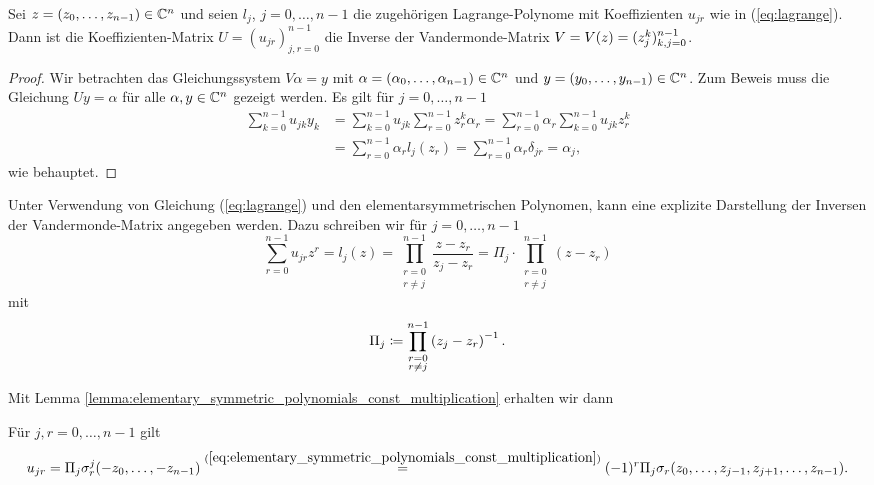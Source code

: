 \begin{lemma}
    \label{lemma:vandermonde-inversion}
    Sei $z = (z_0, \dots, z_{n-1}) \in \mathbb{C}^n$ und seien
    $l_j$, $j = 0, \dots, n-1$ die zugehörigen Lagrange-Polynome
    mit Koeffizienten $u_{jr}$ wie in (\ref{eq:lagrange}).
    Dann ist die Koeffizienten-Matrix $U = (u_{jr})_{j,r = 0}^{n-1}$ die
    Inverse der Vandermonde-Matrix $V = V \! \left( z \right) = (z_{j}^{k})_{k,j = 0}^{n-1}$.
\end{lemma}

\begin{proof}
    Wir betrachten das Gleichungssystem $V \alpha = y$ mit
    $\alpha = (\alpha_0, \dots, \alpha_{n-1}) \in \mathbb{C}^n$
    und $y = (y_0, \dots, y_{n-1}) \in \mathbb{C}^n$.
    Zum Beweis muss die Gleichung $U y = \alpha$ für alle $\alpha,  y \in \mathbb{C}^n$
    gezeigt werden.
    Es gilt für $j = 0, \dots, n-1$
    \[
        \begin{split}
            \sum_{k=0}^{n-1} u_{jk} y_k &= \sum_{k=0}^{n-1} u_{jk} \sum_{r=0}^{n-1} z_r^k \alpha_r = \sum_{r=0}^{n-1} \alpha_r \sum_{k=0}^{n-1} u_{jk} z_r^k\\
                                        &= \sum_{r=0}^{n-1} \alpha_r l_j(z_r) = \sum_{r=0}^{n-1} \alpha_r \delta_{jr} = \alpha_j,
        \end{split}
    \]
    wie behauptet.
\end{proof}

Unter Verwendung von Gleichung (\ref{eq:lagrange}) und den
elementarsymmetrischen Polynomen, kann eine explizite Darstellung der
Inversen der Vandermonde-Matrix angegeben werden.
Dazu schreiben wir für $j = 0, \dots, n-1$
\begin{equation*}
    \sum_{r = 0}^{n-1} u_{jr} z^{r}
    = l_j(z)
    = \prod_{\substack{r=0\\ r \neq j}}^{n-1} \frac{z - z_r}{z_j - z_r}
    = \Pi_j \cdot \prod_{\substack{r=0\\ r \neq j}}^{n-1} \left( z - z_r \right)
\end{equation*}
mit
\begin{equation}
    \label{def:pi_j}
    \Pi_j \coloneqq \prod_{\substack{r=0\\ r \neq j}}^{n-1} \left( z_j - z_r \right)^{-1}.
\end{equation}

\noindent Mit Lemma
\ref{lemma:elementary_symmetric_polynomials_const_multiplication} erhalten
wir dann
\begin{lemma}
    Für $j, r = 0, \dots, n-1$ gilt
    \begin{equation}
        \label{eq:explicit_inverse_vandermonde}
        u_{jr}
        = \Pi_j \sigma_{r}^{j}(-z_0, \dots, -z_{n-1})
        \overset{(\ref{eq:elementary_symmetric_polynomials_const_multiplication})}{=}
          (-1)^r \Pi_j \sigma_{r}(z_0, \dots, z_{j-1}, z_{j+1}, \dots, z_{n-1}).
    \end{equation}
\end{lemma}

